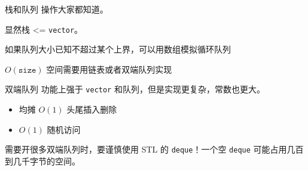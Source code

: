 \documentclass[11pt,aspectratio=169]{beamer}
\begin{document}
\begin{frame}{栈和队列}
    操作大家都知道。

    显然栈 <= \texttt{vector}。

    如果队列大小已知不超过某个上界，可以用数组模拟循环队列

    $O(\mathtt{size})$ 空间需要用链表或者双端队列实现
\end{frame}

\begin{frame}{双端队列}
    功能上强于 \texttt{vector} 和队列，但是实现更复杂，常数也更大。

    \begin{itemize}
        \item 均摊 $O(1)$ 头尾插入删除
        \item $O(1)$ 随机访问
    \end{itemize}

    需要开很多双端队列时，要谨慎使用 STL 的 \texttt{deque}！一个空 \texttt{deque} 可能占用几百到几千字节的空间。 
\end{frame}
\end{document}
